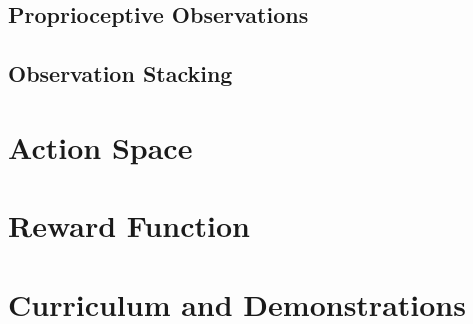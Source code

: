 \subsection{Proprioceptive Observations}


\subsection{Observation Stacking}



\section{Action Space}



\section{Reward Function}



\section{Curriculum and Demonstrations}


